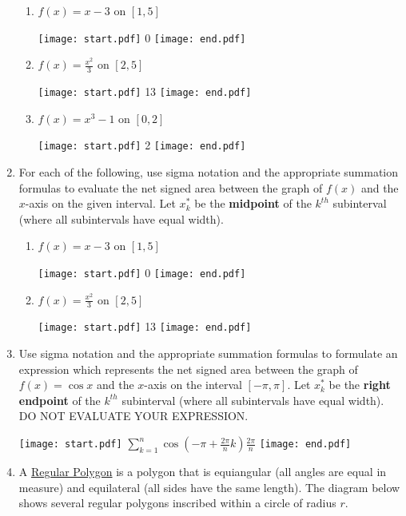 \documentclass[12pt]{article}
\begin{document}
\begin{enumerate}
\begin{enumerate}

\item $f(x)=x-3$ on $[1,5]$

\texttt{[image: start.pdf]}
{{0}}
\texttt{[image: end.pdf]}


\item $f(x)=\frac{x^2}{3}$ on $[2,5]$

\texttt{[image: start.pdf]}
{{13}}
\texttt{[image: end.pdf]}


\item $f(x)=x^3-1$ on $[0,2]$

\texttt{[image: start.pdf]}
{{2}}
\texttt{[image: end.pdf]}


\end{enumerate}

\item For each of the following, use sigma notation and the appropriate summation formulas to evaluate the net signed area between the graph of $f(x)$ and the $x$-axis on the given interval.  Let $x_k^*$ be the {\bf midpoint} of the $k^{th}$ subinterval (where all subintervals have equal width).

\begin{enumerate}

\item $f(x)=x-3$ on $[1,5]$

\texttt{[image: start.pdf]}
{{0}}
\texttt{[image: end.pdf]}


\item $f(x)=\frac{x^2}{3}$ on $[2,5]$

\texttt{[image: start.pdf]}
{{13}}
\texttt{[image: end.pdf]}


\end{enumerate}

\item Use sigma notation and the appropriate summation formulas to formulate an expression which represents the net signed area between the graph of $f(x)=\cos{x}$ and the $x$-axis on the interval $[-\pi,\pi]$.  Let $x_k^*$ be the {\bf right endpoint} of the $k^{th}$ subinterval (where all subintervals have equal width).  DO NOT EVALUATE YOUR EXPRESSION.

\texttt{[image: start.pdf]}
{{$\sum_{k=1}^n\cos{\left(-\pi+\frac{2\pi}{n}k\right)}\frac{2\pi}{n}$}}
\texttt{[image: end.pdf]}


\medskip

\item A \underline{Regular Polygon} is a polygon that is equiangular (all angles are equal in measure) and equilateral (all sides have the same length).  The diagram below shows several regular polygons inscribed within a circle of radius $r$.


\end{enumerate}
\end{document}
